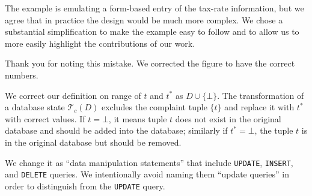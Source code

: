 The example is emulating a form-based entry of the tax-rate information, but
we agree that in practice the design would be much more complex. We chose a
substantial simplification to make the example easy to follow and to allow us
to more easily highlight the contributions of our work.

\begin{quote}
\end{quote}

Thank you for noting this mistake. We corrected the figure to have the
correct numbers.


\begin{quote}
\end{quote}

 


\begin{quote}
\end{quote}

We correct our definition on range of $t$ and $t^*$ as $D \cup \{\bot\}$. The transformation of 
a database state $\mathcal{T}_c(D)$ excludes the complaint tuple $\{t\}$ and replace it with 
$t^*$ with correct values. If $t = \bot$, it means tuple $t$ does not exist in the original
database and should be added into the database; similarly if $t^* = \bot$, the tuple $t$ is in
the original database but should be removed. 


\begin{quote}
\end{quote}

We change it as ``data manipulation statements'' that include \texttt{UPDATE},
\texttt{INSERT}, and \texttt{DELETE} queries. We intentionally avoid naming 
them ``update queries'' in order to distinguish from the \texttt{UPDATE} query. 


